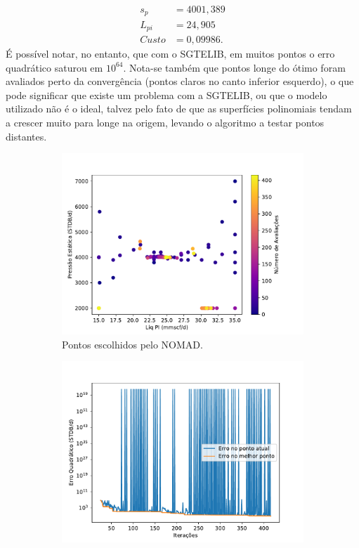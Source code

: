 \begin{align*}
s_p&= 4001,389 \\
L_{pi} &= 24,905 \\
Custo &= 0,09986.
\end{align*}
É possível notar, no entanto, que com o SGTELIB, em muitos pontos o erro quadrático saturou em $10^{64}$. Nota-se também que pontos longe do ótimo foram avaliados perto da convergência (pontos claros no canto inferior esquerdo), o que pode significar que existe um problema com a SGTELIB, ou que o modelo utilizado não é o ideal, talvez pelo fato de que as superfícies polinomiais tendam a crescer muito para longe na origem, levando o algoritmo a testar pontos distantes.

\begin{figure}
\centering
\begin{subfigure}{0.5\textwidth}
  \centering
  \includegraphics[width=1\linewidth]{figs/setup1sgtelib_eval_points.pdf}
  \caption{Pontos escolhidos pelo NOMAD.}
  \label{fig:setup2_points}
\end{subfigure}%
\begin{subfigure}{0.5\textwidth}
  \centering
  \includegraphics[width=1\linewidth]{figs/setup1sgtelib_errors.pdf}

\end{subfigure}
\end{figure}
